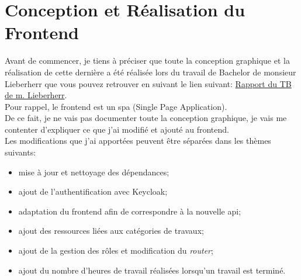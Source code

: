 \documentclass[
    iai, %
    il, %
]{heig-tb}
\begin{document}
\chapter{Conception et Réalisation du Frontend}
Avant de commencer, je tiens à préciser que toute la conception graphique et la réalisation de cette dernière a été réalisée lors du travail de Bachelor de monsieur Lieberherr que vous pouvez retrouver en suivant le lien suivant: \href{https://tb.heig-vd.ch/7532}{Rapport du TB de m. Lieberherr}. \\
Pour rappel, le \Gls{frontend} est un \Gls{spa} (Single Page Application). \\
De ce fait, je ne vais pas documenter toute la conception graphique, je vais me contenter d'expliquer ce que j'ai modifié et ajouté au \Gls{frontend}. \\
Les modifications que j'ai apportées peuvent être séparées dans les thèmes suivants:
\begin{itemize}
    \item mise à jour et nettoyage des dépendances;
    \item ajout de l'authentification avec Keycloak;
    \item adaptation du \Gls{frontend} afin de correspondre à la nouvelle \Gls{api};
    \item ajout des ressources liées aux catégories de travaux;
    \item ajout de la gestion des rôles et modification du \emph{router};
    \item ajout du nombre d'heures de travail réalisées lorsqu'un travail est terminé.
\end{itemize}
\end{document}
